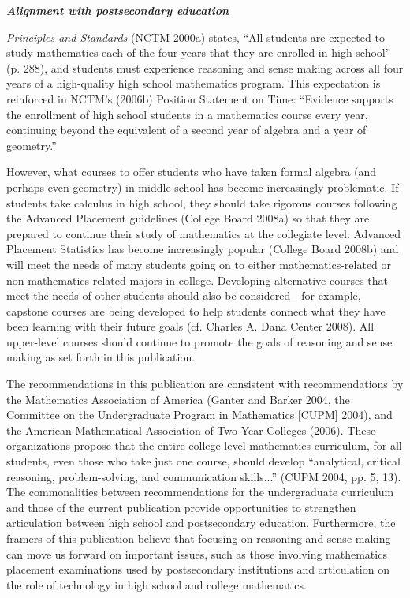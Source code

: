 \documentclass[
  10pt,
  a4paper,
  landscape,
  twoside,
  openany
]{scrbook}
\newcommand{\EN}[1]{#1}
\newcounter{example}
\begin{document}
\TriPara
{
\EN{
\noindent
\textbf{\emph{Alignment with postsecondary education}}

\emph{Principles and Standards} (NCTM 2000a) states, ``All students are expected to study mathematics each of the four years that they are enrolled in high school'' (p. 288), and students must experience reasoning and sense making across all four years of a high-quality high school mathematics program. This expectation is reinforced in NCTM's (2006b) Position Statement on Time: ``Evidence supports the enrollment of high school students in a mathematics course every year, continuing beyond the equivalent of a second year of algebra and a year of geometry.''

However, what courses to offer students who have taken formal algebra (and perhaps even geometry) in middle school has become increasingly problematic. If students take calculus in high school, they should take rigorous courses following the Advanced Placement guidelines (College Board 2008a) so that they are prepared to continue their study of mathematics at the collegiate level. Advanced Placement Statistics has become increasingly popular (College Board 2008b) and will meet the needs of many students going on to either mathematics-related or non-mathematics-related majors in college. Developing alternative courses that meet the needs of other students should also be considered---for example, capstone courses are being developed to help students connect what they have been learning with their future goals (cf. Charles A. Dana Center 2008). All upper-level courses should continue to promote the goals of reasoning and sense making as set forth in this publication.

The recommendations in this publication are consistent with recommendations by the Mathematics Association of America (Ganter and Barker 2004, the Committee on the Undergraduate Program in Mathematics [CUPM] 2004), and the American Mathematical Association of Two-Year Colleges (2006). These organizations propose that the entire college-level mathematics curriculum, for all students, even those who take just one course, should develop ``analytical, critical reasoning, problem-solving, and communication skills...'' (CUPM 2004, pp. 5, 13). The commonalities between recommendations for the undergraduate curriculum and those of the current publication provide opportunities to strengthen articulation between high school and postsecondary education. Furthermore, the framers of this publication believe that focusing on reasoning and sense making can move us forward on important issues, such as those involving mathematics placement examinations used by postsecondary institutions and articulation on the role of technology in high school and college mathematics.}
}
\end{document}
